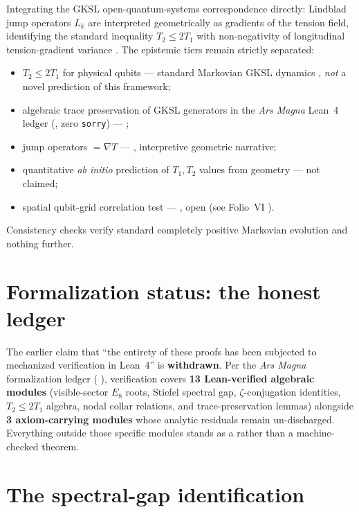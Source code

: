 \documentclass{alienfolio}
\begin{document}
Integrating the GKSL open-quantum-systems correspondence directly:
Lindblad jump operators $L_k$ are interpreted geometrically as gradients
of the tension field, identifying the standard inequality $T_2 \le 2T_1$
with non-negativity of longitudinal tension-gradient variance
. The epistemic tiers remain strictly separated:
\begin{itemize}
\item $T_2 \le 2T_1$ for physical qubits --- 
standard Markovian GKSL dynamics \cite{gks76,lindblad76}, \emph{not} a
novel prediction of this framework;
\item algebraic trace preservation of GKSL generators in the \emph{Ars
Magna} Lean~4 ledger (\cite{arsmagna}, zero \texttt{sorry}) ---
;
\item jump operators $= \nabla T$ --- ,
interpretive geometric narrative;
\item quantitative \textit{ab initio} prediction of $T_1, T_2$ values
from geometry --- not claimed;
\item spatial qubit-grid correlation test --- , open
(see Folio~VI \cite{folio-vi}).
\end{itemize}
Consistency checks verify standard completely positive Markovian
evolution and nothing further.

\section{Formalization status: the honest ledger}
\label{sec:formalization}

The earlier claim that ``the entirety of these proofs has been subjected
to mechanized verification in Lean~4'' is \textbf{withdrawn}. Per the
\emph{Ars Magna} formalization ledger (
\cite{arsmagna}), verification covers \textbf{13 Lean-verified algebraic
modules} (visible-sector $E_8$ roots, Stiefel spectral gap,
$\zeta$-conjugation identities, $T_2 \le 2T_1$ algebra, nodal collar
relations, and trace-preservation lemmas) alongside \textbf{3
axiom-carrying modules} whose analytic residuals remain un-discharged.
Everything outside those specific modules stands as a  rather than a machine-checked theorem.

\section{The spectral-gap identification}
\label{sec:spectralgap}
\end{document}
